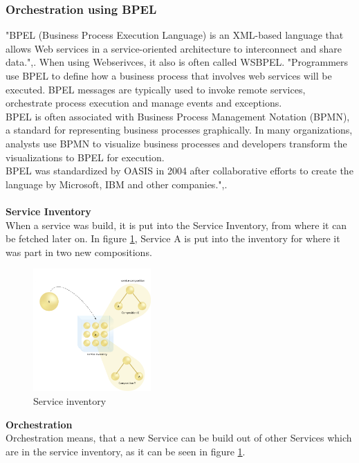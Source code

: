 \documentclass[12pt]{article}
\begin{document}
\subsubsection{Orchestration using BPEL}
\label{sec:bpel}
"BPEL (Business Process Execution Language) is an XML-based language that allows Web services in a service-oriented architecture to interconnect and share data.",\cite{bpelsearchsoa}. When using Webserivces, it also is often called WSBPEL. "Programmers use BPEL to define how a business process that involves web services will be executed. BPEL messages are typically used to invoke remote services, orchestrate process execution and manage events and exceptions.\\
BPEL is often associated with Business Process Management Notation (BPMN), a standard for representing business processes graphically. In many organizations, analysts use BPMN to visualize business processes and developers transform the visualizations to BPEL for execution.\\
BPEL was standardized by OASIS in 2004 after collaborative efforts to create the language by Microsoft, IBM and other companies.",\cite{bpelsearchsoa}.\\
\\
\textbf{Service Inventory}\\
When a service was build, it is put into the Service Inventory, from where it can be fetched later on. In figure \ref{fig:Serviceinventory}, Service A is put into the inventory for where it was part in two new compositions. 
\begin{figure}
	\centering
	\includegraphics[width=0.4\textwidth]{images/picservi0}
	\caption{Service inventory\cite{picservi}}
	\label{fig:Serviceinventory}
	\end{figure}
	\FloatBarrier \noindent
\textbf{Orchestration}\\
Orchestration means, that a new Service can be build out of other Services which are in the service inventory, as it can be seen in figure \ref{fig:Serviceinventory}. \\
\end{document}
